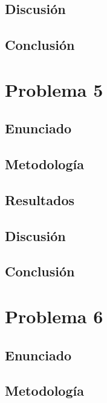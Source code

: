 \documentclass{article}
\begin{document}
\subsection{Discusión}

\subsection{Conclusión}

\section{Problema 5}

\subsection{Enunciado}

\subsection{Metodología}

\subsection{Resultados}
\setcounter{equation}{0}

\subsection{Discusión}

\subsection{Conclusión}

\section{Problema 6}

\subsection{Enunciado}

\subsection{Metodología}
\end{document}
